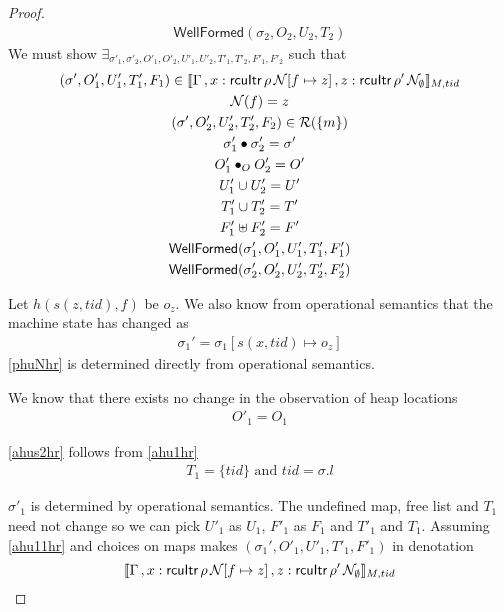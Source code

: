 \begin{proof}
\begin{gather}
\label{ahu17hr}
\textsf{WellFormed}(\sigma_2,O_{2},U_{2},T_{2})
\end{gather}
We must show $\exists_{\sigma'_1, \sigma'_2, O'_{1}, O'_{2}, U'_{1}, U'_{2}, T'_{1}, T'_{2},F'_1 ,F'_2}$ such that
\begin{gather}\label{phu5hr}
\begin{aligned}
(\sigma',O'_{1},U'_{1}, T'_{1},F_1)  \in \llbracket \Gamma\,,  x:\textsf{rcuItr} \, \rho \, \mathcal{N}[f\mapsto z]\, ,z:\textsf{rcuItr} \, \rho' \, \mathcal{N}_{\emptyset} \rrbracket_{M,tid}
\end{aligned}
\\
\label{phuNhr}
\mathcal{N}(f) = z
\\
\label{phu6hr}
(\sigma',O'_{2},U'_{2}, T'_{2}, F_2) \in \mathcal{R}(\{m\})
\\
\label{ahusighr'}
\sigma'_1 \bullet \sigma'_2 = \sigma'
\\
\label{phu7hr}
O'_{1} \bullet_{O} O'_{2} = O'
\\
\label{phu8hr}
U'_{1} \cup U'_{2} = U'
\\
\label{phu9hr}
T'_{1} \cup T'_{2} = T'
\\
\label{phuhrf}
F'_1 \uplus F'_2 = F'
\\
\label{phu10hr}
\textsf{WellFormed}(\sigma_1',O'_{1},U'_{1},T'_{1},F'_1) \\
\label{phu11hr}
\textsf{WellFormed}(\sigma_2',O'_{2},U'_{2},T'_{2},F'_2)
\end{gather}

Let $h(s(z,tid),f)$ be $o_z$. We also know from operational semantics that the machine state has changed as
\begin{gather}\label{ahushr}
\sigma_1' =  \sigma_1[s(x,tid) \mapsto o_z]
\end{gather}
\ref{phuNhr} is determined directly from operational semantics.

We know that there exists no change in the observation of heap locations
\begin{gather}\label{ahus1hr}
O'_1 =  O_1
\end{gather}

\ref{ahus2hr} follows from \ref{ahu1hr}
\begin{gather}\label{ahus2hr}
  T_1 = \{tid\} \text{ and } tid = \sigma.l
\end{gather}

$\sigma'_1$ is determined by operational semantics. The undefined map, free list and $T_1$ need not change so we can pick $U'_1$ as $U_1$, $F'_1$ as $F_1$ and $T'_1$ and $T_1$. Assuming \ref{ahu11hr} and choices on maps makes $(\sigma_1',O'_{1},U'_{1}, T'_{1},F'_1)$ in denotation
\[ \llbracket \Gamma\,,  x:\textsf{rcuItr} \, \rho \, \mathcal{N}[f\mapsto z]\, ,z:\textsf{rcuItr} \, \rho' \, \mathcal{N}_{\emptyset} \rrbracket_{M,tid}\]


\end{proof}
